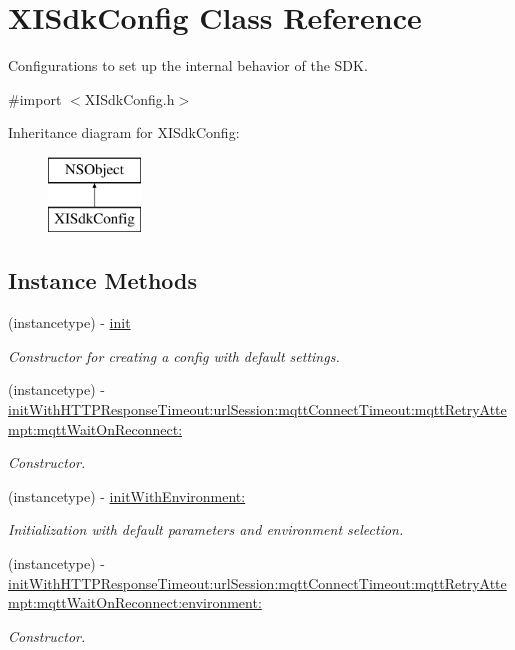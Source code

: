 \hypertarget{class_x_i_sdk_config}{}\section{X\+I\+Sdk\+Config Class Reference}
\label{class_x_i_sdk_config}


Configurations to set up the internal behavior of the S\+DK.  




{\ttfamily \#import $<$X\+I\+Sdk\+Config.\+h$>$}

Inheritance diagram for X\+I\+Sdk\+Config\+:\begin{figure}[H]
\begin{center}
\leavevmode
\includegraphics[height=2.000000cm]{class_x_i_sdk_config}
\end{center}
\end{figure}
\subsection*{Instance Methods}
\begin{DoxyCompactItemize}
\item 
(instancetype) -\/ \hyperlink{class_x_i_sdk_config_ab73045dfa620f53c0176047df7109856}{init}
\begin{DoxyCompactList}\small\item\em Constructor for creating a config with default settings. \end{DoxyCompactList}\item 
(instancetype) -\/ \hyperlink{class_x_i_sdk_config_aeea5606d1560af2396d135819f5f9596}{init\+With\+H\+T\+T\+P\+Response\+Timeout\+:url\+Session\+:mqtt\+Connect\+Timeout\+:mqtt\+Retry\+Attempt\+:mqtt\+Wait\+On\+Reconnect\+:}
\begin{DoxyCompactList}\small\item\em Constructor. \end{DoxyCompactList}\item 
(instancetype) -\/ \hyperlink{class_x_i_sdk_config_aaf78fa6769fee2f17ba641609f112e55}{init\+With\+Environment\+:}
\begin{DoxyCompactList}\small\item\em Initialization with default parameters and environment selection. \end{DoxyCompactList}\item 
(instancetype) -\/ \hyperlink{class_x_i_sdk_config_aeceeeb80a520f874d9793485a70bd591}{init\+With\+H\+T\+T\+P\+Response\+Timeout\+:url\+Session\+:mqtt\+Connect\+Timeout\+:mqtt\+Retry\+Attempt\+:mqtt\+Wait\+On\+Reconnect\+:environment\+:}
\begin{DoxyCompactList}\small\item\em Constructor. \end{DoxyCompactList}\end{DoxyCompactItemize}
